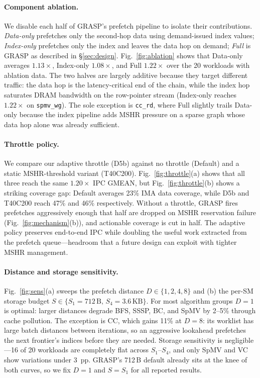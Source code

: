 \documentclass[sigconf, screen, review]{acmart}
\begin{document}
\paragraph{Component ablation.}
We disable each half of GRASP's prefetch pipeline to isolate
their contributions. \emph{Data-only} prefetches only the
second-hop data using demand-issued index values;
\emph{Index-only} prefetches only the index and leaves the data
hop on demand; \emph{Full} is GRASP as described in
\S\ref{sec:design}. Fig.~\ref{fig:ablation} shows that Data-only
averages $1.13\times$, Index-only $1.08\times$, and Full
$1.22\times$ over the 20 workloads with ablation data. The two
halves are largely additive because they target different
traffic: the data hop is the latency-critical end of the chain,
while the index hop saturates DRAM bandwidth on the row-pointer
stream (Index-only reaches $1.22\times$ on \texttt{spmv\_wg}).
The sole exception is \texttt{cc\_rd}, where Full slightly trails
Data-only because the index pipeline adds MSHR pressure on a
sparse graph whose data hop alone was already sufficient.

\paragraph{Throttle policy.}
We compare our adaptive throttle (D5b) against no throttle
(Default) and a static MSHR-threshold variant (T40C200).
Fig.~\ref{fig:throttle}(a) shows that all three reach the same
$1.20\times$ IPC GMEAN, but Fig.~\ref{fig:throttle}(b) shows a
striking coverage gap: Default averages 23\% IMA data coverage,
while D5b and T40C200 reach 47\% and 46\% respectively. Without
a throttle, GRASP fires prefetches aggressively enough that half
are dropped on MSHR reservation failure (Fig.~\ref{fig:mechanism}(b)),
and actionable coverage is cut in half. The adaptive policy
preserves end-to-end IPC while doubling the useful work
extracted from the prefetch queue---headroom that a future
design can exploit with tighter MSHR management.

\paragraph{Distance and storage sensitivity.}
Fig.~\ref{fig:sens}(a) sweeps the prefetch distance
$D\in\{1,2,4,8\}$ and (b) the per-SM storage budget
$S\in\{S_1{=}712\,\text{B},\,S_4{=}3.6\,\text{KB}\}$.
For most algorithm groups $D{=}1$ is optimal: larger distances
degrade BFS, SSSP, BC, and SpMV by 2--5\% through cache
pollution. The exception is CC, which gains 11\% at $D{=}8$:
its worklist has large batch distances between iterations, so
an aggressive lookahead prefetches the next frontier's indices
before they are needed. Storage sensitivity is negligible---16
of 20 workloads are completely flat across $S_1$--$S_4$, and
only SpMV and VC show variations under 3~pp. GRASP's 712\,B
default already sits at the knee of both curves, so we fix
$D{=}1$ and $S{=}S_1$ for all reported results.
\end{document}
